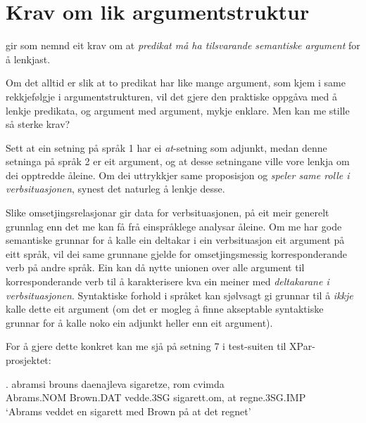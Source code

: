 \documentclass[11pt,a4paper,oneside,draft]{book}
\begin{document}
\section{Krav om lik argumentstruktur}
\label{sec-3.7}

\label{SEC:lik-argstr}

\citet{thunes2003eal} gir som nemnd eit krav om at \emph{predikat må ha tilsvarande semantiske argument} for å lenkjast.

Om det alltid er slik at to predikat har like mange argument, som kjem i
same rekkjefølgje i argumentstrukturen, vil det gjere den praktiske
oppgåva med å lenkje predikata, og argument med argument, mykje
enklare. Men kan me stille så sterke krav?

Sett at ein setning på språk 1 har ei \emph{at}-setning som adjunkt, medan
denne setninga på språk 2 er eit argument, og at desse setningane
ville vore lenkja om dei opptredde åleine. Om dei uttrykkjer same
proposisjon og \emph{speler same rolle i verbsituasjonen},
synest det naturleg å lenkje desse.  

Slike omsetjingsrelasjonar gir data for verbsituasjonen, på eit meir generelt
grunnlag enn det me kan få frå einspråklege analysar åleine. Om me har
gode semantiske grunnar for å kalle ein deltakar i ein verbsituasjon
eit argument på eitt språk, vil dei same grunnane gjelde for
omsetjingsmessig korresponderande verb på andre språk. Ein kan då
nytte unionen over alle argument til korresponderande verb til å
karakterisere kva ein meiner med \emph{deltakarane i verbsituasjonen}. Syntaktiske forhold i språket kan sjølvsagt gi
grunnar til å \emph{ikkje} kalle dette eit argument (om det er mogleg å
finne akseptable syntaktiske grunnar for å kalle noko ein adjunkt
heller enn eit argument).
 
For å gjere dette konkret kan me sjå på setning 7 i test-suiten til
XPar-prosjektet:

\exg.  abramsi brouns       daenajleva sigaretze, rom cvimda \\
      Abrams.NOM Brown.DAT vedde.3SG sigarett.om, at  regne.3SG.IMP \\
     `Abrams veddet en sigarett med Brown på at det regnet' 
\end{document}
